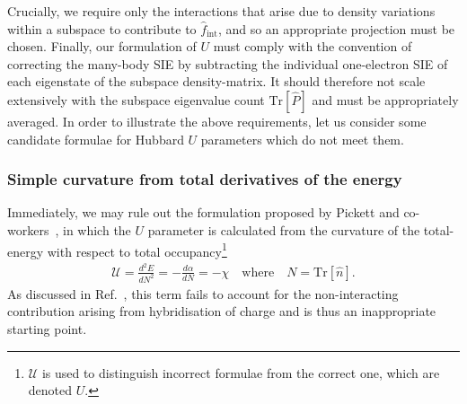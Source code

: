 Crucially, 
we require only the interactions  
that arise due to density variations within a subspace 
to contribute to  
$\hat{f}_\textrm{int}$, 
and so an appropriate projection must be chosen.
%
Finally, our formulation of $U$ must comply with  
the convention of correcting the many-body SIE  
by subtracting the individual one-electron SIE  
of each eigenstate of the subspace density-matrix. 
%
It should therefore not scale extensively with 
the subspace eigenvalue count $\mathrm{Tr} [ \hat{P} ]$ 
and must be appropriately averaged.
%
In order to illustrate the above requirements, 
let us consider some candidate formulae for Hubbard 
$U$ parameters which do not meet them.


\subsubsection{Simple curvature from total derivatives of the energy}

Immediately, we may rule out 
the formulation 
proposed by Pickett and co-workers~\cite{PhysRevB.58.1201}, 
in which the $U$ parameter is calculated 
from the curvature of the total-energy 
with respect to total occupancy\footnote{$\mathcal{U}$ 
is used to distinguish incorrect formulae 
from the correct one, which are denoted $U$.} 
%
\begin{align}
\mathcal{U}=\frac{d^2E}{dN^2}=-\frac{d\alpha}{dN}=-\chi 
\quad\mbox{where}\quad
N=\textrm{Tr}\left[\hat{n}\right].
\end{align}
% 
As discussed  in Ref.~\cite{PhysRevB.71.035105}, 
this term fails to account for the non-interacting 
contribution arising from hybridisation of charge 
and is thus an inappropriate starting point.

